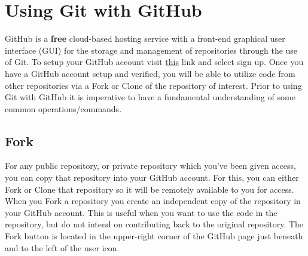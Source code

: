 \documentclass{article}
\begin{document}
\section*{Using Git with GitHub}
GitHub is a \textbf{free} cloud-based hosting service with a front-end graphical user interface (GUI) for the storage and management of repositories through the use of Git. To setup your GitHub account visit \href{https://github.com/}{this} link and select sign up. Once you have a GitHub account setup and verified, you will be able to utilize code from other repositories via a Fork or Clone of the repository of interest. Prior to using Git with GitHub it is imperative to have a fundamental understanding of some common operations/commands. 

\subsection*{Fork}
For any public repository, or private repository which you've been given access, you can copy that repository into your GitHub account. For this, you can either Fork or Clone that repository so it will be remotely available to you for access. When you Fork a repository you create an independent copy of the repository in your GitHub account. This is useful when you want to use the code in the repository, but do not intend on contributing back to the original repository. The Fork button is located in the upper-right corner of the GitHub page just beneath and to the left of the user icon.
\end{document}
